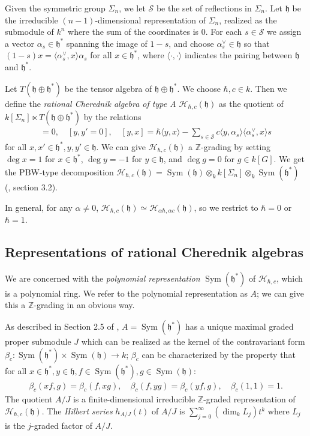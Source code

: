 \documentclass{article}
\numberwithin{equation}{section}
\newcommand{\h}{\mathfrak{h}}
\newcommand{\HH}{\mathcal{H}}
\newcommand{\Sym}{\operatorname{Sym}}
\begin{document}
Given the symmetric group $\Sigma_n$, we let $\mathcal{S}$ be the set of reflections in $\Sigma_n$. Let $\h$ be the irreducible $(n-1)$-dimensional representation of $\Sigma_n$, realized as the submodule of $k^n$ where the sum of the coordinates is $0$. For each $s \in \mathcal{S}$ we assign a vector $\alpha_s \in \h^*$ spanning the image of $1-s$, and choose $\alpha_s^\vee \in \h$ so that $(1-s)x=\langle \alpha_s^\vee,x\rangle \alpha_s$ for all $x \in \h^*$, where $\langle \cdot,\cdot\rangle$ indicates the pairing between $\h$ and $\h^*$. 

Let $T(\h \oplus \h^*)$ be the tensor algebra of $\h \oplus \h^*$. We choose $\hbar,c \in k$. Then we define the {\it rational Cherednik algebra of type A $\HH_{\hbar,c}(\h)$} as the quotient of $k[\Sigma_n] \ltimes T(\h \oplus \h^*)$ by the relations
\begin{align*}
[x,x']=0, \quad [y,y' = 0], \quad [y,x] = \hbar\langle y,x\rangle - \sum_{s \in \mathcal{S}} c\langle y,\alpha_s\rangle\langle \alpha_s^\vee,x\rangle s
\end{align*}
 for all $x,x' \in \h^*, y,y' \in \h$. We can give $\HH_{\hbar,c}(\h)$ a $\mathbb{Z}$-grading by setting $\deg x=1$ for $x \in \h^*$, $\deg y = -1$ for $y \in \h$, and $\deg g=0$ for $g \in k[G]$. We get the PBW-type decomposition $\HH_{\hbar,c}(\h)=\Sym(\h) \otimes_k k[\Sigma_n] \otimes_k \Sym(\h^*)$ (\cite{EM}, section 3.2). 

In general, for any $\alpha \ne 0$, $\HH_{\hbar,c}(\h)\simeq \HH_{\alpha\hbar,\alpha c}(\h)$, so we restrict to $\hbar=0$ or $\hbar = 1$. 

\subsection{Representations of rational Cherednik algebras}

We are concerned with the {\it polynomial representation} $\Sym(\h^*)$ of $\HH_{\hbar,c}$, which is a polynomial ring. We refer to the polynomial representation as $A$; we can give this a $\mathbb{Z}$-grading in an obvious way. 

As described in Section 2.5 of \cite{BC1}, $A=\Sym(\h^*)$ has a unique maximal graded proper submodule $J$ which can be realized as the kernel of the contravariant form $\beta_c: \Sym(\h^*) \times \Sym(\h) \to k$; $\beta_c$ can be characterized by the property that for all $x \in \h^*, y \in \h, f \in \Sym(\h^*), g \in  \Sym(\h)$:
\begin{align*}
\beta_c(xf,g)=\beta_c(f,xg), \quad \beta_c(f,yg) = \beta_c(yf,g), \quad \beta_c(1,1) = 1.
\end{align*}
The quotient $A/J$ is a finite-dimensional irreducible $\mathbb{Z}$-graded representation of $\HH_{\hbar,c}(\h)$. The {\it Hilbert series} $h_{A/J}(t)$ of $A/J$ is $\sum_{j=0}^\infty (\dim_k L_j)t^k$ where $L_j$ is the $j$-graded factor of $A/J$. 
\end{document}
